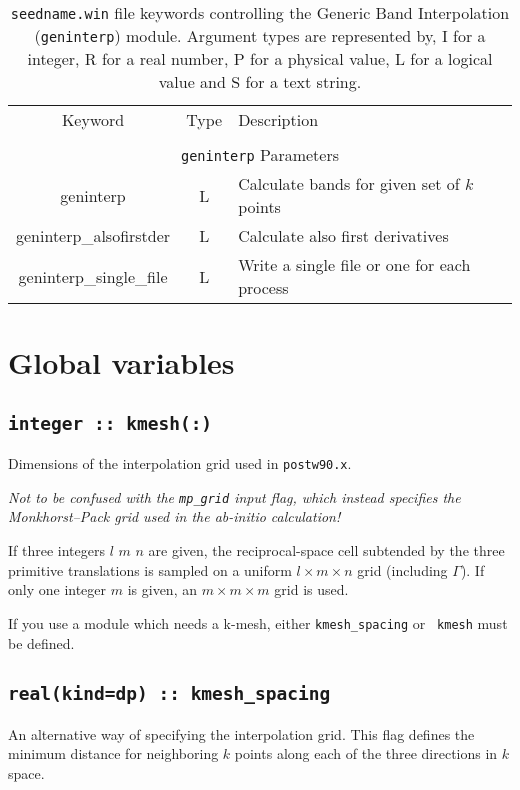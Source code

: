 \begin{table}[h!]
\begin{center}
\begin{tabular}{|c|c|p{6cm}|}
\hline
Keyword & Type & Description \\
        &      &             \\
\hline\hline
\multicolumn{3}{|c|}{{\tt geninterp} Parameters} \\
\hline
{\sc geninterp}   & L & Calculate bands for given set of $k$ points \\
{\sc geninterp\_alsofirstder} & L & Calculate also first derivatives\\ 
{\sc geninterp\_single\_file} & L & Write a single file or one for each
process\\ 
\hline
\end{tabular}
\caption[Parameter file keywords controlling the geninterp module.]
{{\tt seedname.win} file keywords controlling the Generic Band
  Interpolation ({\tt geninterp}) module. Argument types
are represented by, I for a integer, R for a real number, P for a
physical value, L for a logical value and S for a text string.}
\label{parameter_keywords_geninterp}
\end{center}
\end{table}

\clearpage
\section{Global variables}
\label{sec:postw90-globalflags}

  \subsection[kmesh]{\tt  integer :: kmesh(:)}  
Dimensions of the interpolation grid used in {\tt postw90.x}.

\emph{Not to be confused with the {\tt mp\_grid} 
input flag, which
  instead specifies the Monkhorst--Pack grid used in the ab-initio calculation!}

If three integers $l$ $m$ $n$ are given, the reciprocal-space cell
subtended by the three primitive translations is sampled on a uniform
$l\times m\times n$ grid (including $\Gamma$).  If only one integer $m$ is given, an
$m\times m\times m$ grid is used.

If you use a module which needs a k-mesh, either {\tt kmesh\_spacing} or {\tt
  kmesh} must be defined.

  \subsection[kmesh\_spacing]{\tt real(kind=dp) :: kmesh\_spacing}
An alternative way of specifying the interpolation grid.
This flag defines the minimum distance for
neighboring $k$ points along each of the three directions in $k$
space. 

